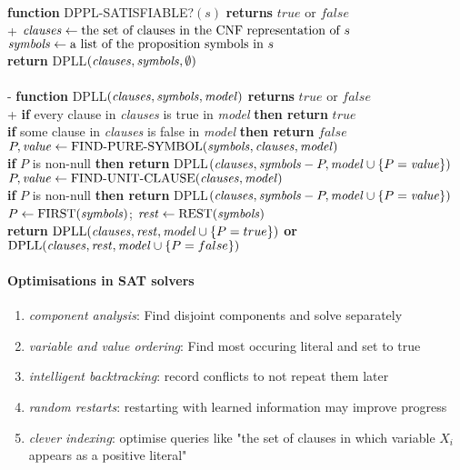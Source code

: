 \documentclass{article}
\begin{document}
\begin{pseudo}
    \textbf{function} DPPL-SATISFIABLE?$(s)$ \textbf{returns} $true$ or $false$\\+
        $\text{\emph{clauses}}\leftarrow\text{the set of clauses in the CNF representation of }s$\\
        $\text{\emph{symbols}}\leftarrow\text{a list of the proposition symbols in }s$\\
        \textbf{return} DPLL$(\text{\emph{clauses}}, \text{\emph{symbols}}, \emptyset)$
    \\\\-
    \textbf{function} DPLL$(\text{\emph{clauses}}, \text{\emph{symbols}}, \text{\emph{model}})$ \textbf{returns} $true$ or $false$\\+
        \textbf{if} every clause in \emph{clauses} is true in \emph{model} \textbf{then return} $true$\\
        \textbf{if} some clause in \emph{clauses} is false in \emph{model} \textbf{then return} $false$\\
        $P,\text{\emph{value}}\leftarrow\text{FIND-PURE-SYMBOL}(\text{\emph{symbols}},\text{\emph{clauses}},\text{\emph{model}})$\\
        \textbf{if} $P$ is non-null \textbf{then return} DPLL$(\text{\emph{clauses}}, \text{\emph{symbols}}-P,\text{\emph{model}}\cup\{P=\text{\emph{value}}\})$\\
        $P,\text{\emph{value}}\leftarrow\text{FIND-UNIT-CLAUSE}(\text{\emph{clauses}}, \text{\emph{model}})$\\
        \textbf{if} $P$ is non-null \textbf{then return} DPLL$(\text{\emph{clauses}}, \text{\emph{symbols}}-P,\text{\emph{model}}\cup\{P=\text{\emph{value}}\})$\\
        $P\leftarrow\text{FIRST}(\text{\emph{symbols}})$; $\text{\emph{rest}}\leftarrow\text{REST}(\text{\emph{symbols}})$\\
        \textbf{return} $\text{DPLL}(\text{\emph{clauses}}, \text{\emph{rest}}, \text{\emph{model}}\cup\{P=true\})$ \textbf{or}
                        $\text{DPLL}(\text{\emph{clauses}}, \text{\emph{rest}}, \text{\emph{model}}\cup\{P=false\})$
\end{pseudo}

\paragraph{Optimisations in SAT solvers}
\begin{enumerate}
    \item \emph{component analysis}: Find disjoint components and solve separately
    \item \emph{variable and value ordering}: Find most occuring literal and set to true
    \item \emph{intelligent backtracking}: record conflicts to not repeat them later
    \item \emph{random restarts}: restarting with learned information may improve progress
    \item \emph{clever indexing}: optimise queries like "the set of clauses in which variable $X_i$ appears as a positive literal"
\end{enumerate}
\end{document}
